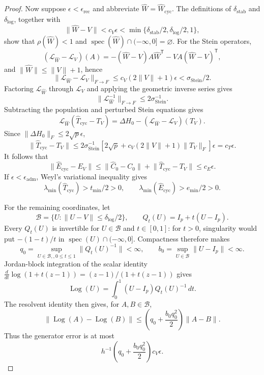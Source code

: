\documentclass{article}
\begin{document}
\begin{proof}
Now suppose \(\epsilon<\epsilon_{\mathrm{rec}}\) and abbreviate \(\widehat W=\widehat W_{\mathrm{cyc}}\).  The definitions of \(\delta_{\mathrm{stab}}\) and \(\delta_{\log}\), together with
\[
 \lVert\widehat W-V\rVert<c_V\epsilon
 <\min\{\delta_{\mathrm{stab}}/2,\delta_{\log}/2,1\},
\]
show that \(\rho(\widehat W)<1\) and \(\operatorname{spec}(\widehat W)\cap(-\infty,0]=\varnothing\).  For the Stein operators,
\[
 (\mathcal L_{\widehat W}-\mathcal L_V)(A)
 =-(\widehat W-V)A\widehat W^{\mathsf T}-VA(\widehat W-V)^{\mathsf T},
\]
and \(\lVert\widehat W\rVert\leq\lVert V\rVert+1\), hence
\[
 \lVert\mathcal L_{\widehat W}-\mathcal L_V\rVert_{F\to F}
 \leq c_V(2\lVert V\rVert+1)\epsilon<\sigma_{\mathrm{Stein}}/2.
\]
Factoring \(\mathcal L_{\widehat W}\) through \(\mathcal L_V\) and applying the geometric inverse series gives
\[
 \lVert\mathcal L_{\widehat W}^{-1}\rVert_{F\to F}
 \leq2\sigma_{\mathrm{Stein}}^{-1}.
\]
Subtracting the population and perturbed Stein equations gives
\[
 \mathcal L_{\widehat W}(\widehat T_{\mathrm{cyc}}-T_V)
 =\Delta H_0-(\mathcal L_{\widehat W}-\mathcal L_V)(T_V).
\]
Since \(\lVert\Delta H_0\rVert_F\leq2\sqrt p\epsilon\),
\[
 \lVert\widehat T_{\mathrm{cyc}}-T_V\rVert
 \leq2\sigma_{\mathrm{Stein}}^{-1}
 [2\sqrt p+c_V(2\lVert V\rVert+1)\lVert T_V\rVert_F]\epsilon
 =c_T\epsilon.
\]
It follows that
\[
 \lVert\widehat E_{\mathrm{cyc}}-E_V\rVert
 \leq\lVert\widehat C_0-C_0\rVert+
 \lVert\widehat T_{\mathrm{cyc}}-T_V\rVert
 \leq c_E\epsilon.
\]
If \(\epsilon<\epsilon_{\mathrm{adm}}\), Weyl's variational inequality gives
\[
 \lambda_{\min}(\widehat T_{\mathrm{cyc}})>t_{\min}/2>0,
 \qquad \lambda_{\min}(\widehat E_{\mathrm{cyc}})>e_{\min}/2>0.
\]

For the remaining coordinates, let
\[
 \mathcal B=\{U:\lVert U-V\rVert\leq\delta_{\log}/2\},\qquad
 Q_t(U)=I_p+t(U-I_p).
\]
Every \(Q_t(U)\) is invertible for \(U\in\mathcal B\) and \(t\in[0,1]\): for \(t>0\), singularity would put \(-(1-t)/t\) in \(\operatorname{spec}(U)\cap(-\infty,0]\).  Compactness therefore makes
\[
 q_0=\sup_{U\in\mathcal B,,0\leq t\leq1}\lVert Q_t(U)^{-1}\rVert<\infty,
 \qquad b_0=\sup_{U\in\mathcal B}\lVert U-I_p\rVert<\infty.
\]
Jordan-block integration of the scalar identity
\(
 \frac{d}{dt}\log(1+t(z-1))=(z-1)/(1+t(z-1))
\)
gives
\[
 \operatorname{Log}(U)=\int_0^1(U-I_p)Q_t(U)^{-1}\,dt.
\]
The resolvent identity then gives, for \(A,B\in\mathcal B\),
\[
 \lVert\operatorname{Log}(A)-\operatorname{Log}(B)\rVert
 \leq\left(q_0+\frac{b_0q_0^2}{2}\right)\lVert A-B\rVert.
\]
Thus the generator error is at most
\[
 h^{-1}\left(q_0+\frac{b_0q_0^2}{2}\right)c_V\epsilon.
\]


\end{proof}
\end{document}
